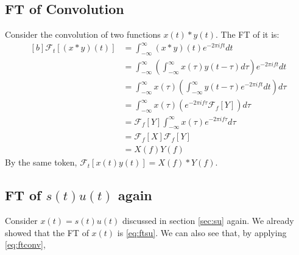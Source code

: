 \documentclass[letterpaper, 11pt]{article}
\newcommand{\fint}{\int_{-\infty}^{\infty}} %
\newcommand{\fourier}[2]{\mathcal{F}_{#1}[#2]} %
\newcommand{\ft}[3]{\fint #2 e^{-2\pi i#3#1} d#1} %
\newcommand{\conv}[4]{\fint #3(#2)#4(#1 - #2) d#2} %
\numberwithin{equation}{section}
\numberwithin{figure}{section}
\begin{document}
\subsection{FT of Convolution}
Consider the convolution of two functions \(x(t)*y(t)\). The FT of it is:
\begin{equation}
	\begin{aligned}[b]
		\fourier{t}{(x*y)(t)}
			&= \ft{t}{(x*y)(t)}{f}\\
			&= \ft{t}{\left (\conv{t}{\tau}{x}{y} \right )}{f}\\ 
			&= \fint x(\tau) \left (\fint y(t - \tau) e^{-2\pi ift} dt \right ) d\tau\\
			&= \fint x(\tau) \left ( e^{-2\pi if\tau}\fourier{f}{Y} \right )d\tau\\ 
			&= \fourier{f}{Y} \ft{\tau}{x(\tau)}{f}\\
			&= \fourier{f}{X} \fourier{f}{Y}\\
			&= X(f)Y(f)
			\label{eq:ftconv}
	\end{aligned}
\end{equation}
By the same token, \(\fourier{t}{x(t)y(t)} = X(f)*Y(f)\). 

\subsection{FT of \(s(t)u(t)\) again}
Consider \(x(t) = s(t)u(t)\) discussed in section \ref{sec:su} again. We already showed that the FT of \(x(t)\) is \eqref{eq:ftsu}. We can also see that, by applying \eqref{eq:ftconv}, 
\printindex
\end{document}
